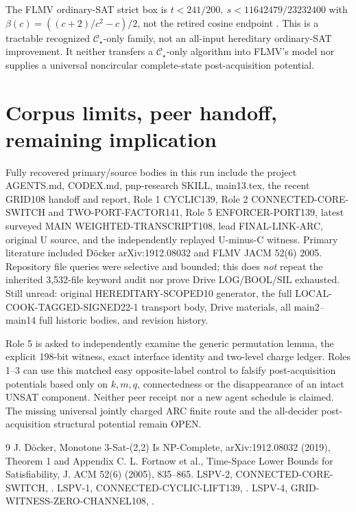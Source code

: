 \documentclass[11pt]{article}
\newcommand{\CS}{\mathcal C_\star}
\begin{document}
The FLMV ordinary-SAT strict box is \(t<241/200,\ s<11642479/23232400\) with \(\beta(c)=((c+2)/c^2-c)/2\), not the retired cosine endpoint \cite{flmv}. This is a tractable recognized \(\CS\)-only family, not an all-input hereditary ordinary-SAT improvement. It neither transfers a \(\CS\)-only algorithm into FLMV's model nor supplies a universal noncircular complete-state post-acquisition potential.

\section{Corpus limits, peer handoff, remaining implication}
Fully recovered primary/source bodies in this run include the project AGENTS.md, CODEX.md, pnp-research SKILL, main13.tex, the recent GRID108 handoff and report, Role 1 CYCLIC139, Role 2 CONNECTED-CORE-SWITCH and TWO-PORT-FACTOR141, Role 5 ENFORCER-PORT139, latest surveyed MAIN WEIGHTED-TRANSCRIPT108, lead FINAL-LINK-ARC, original U source, and the independently replayed U-minus-C witness. Primary literature included D\"ocker arXiv:1912.08032 and FLMV JACM 52(6) 2005. Repository file queries were selective and bounded; this does \emph{not} repeat the inherited 3,532-file keyword audit nor prove Drive LOG/BOOL/SIL exhausted. Still unread: original HEREDITARY-SCOPED10 generator, the full LOCAL-COOK-TAGGED-SIGNED22-1 transport body, Drive materials, all main2--main14 full historic bodies, and revision history.

Role 5 is asked to independently examine the generic permutation lemma, the explicit 198-bit witness, exact interface identity and two-level charge ledger. Roles 1--3 can use this matched easy opposite-label control to falsify post-acquisition potentials based only on \(k,m,q\), connectedness or the disappearance of an intact UNSAT component. Neither peer receipt nor a new agent schedule is claimed. The missing universal jointly charged ARC finite route and the all-decider post-acquisition structural potential remain OPEN.

\begin{thebibliography}{9}
 J. D\"ocker, Monotone 3-Sat-(2,2) Is NP-Complete, arXiv:1912.08032 (2019), Theorem 1 and Appendix C.
 L. Fortnow et al., Time-Space Lower Bounds for Satisfiability, J. ACM 52(6) (2005), 835--865.
 LSPV-2, CONNECTED-CORE-SWITCH, .
 LSPV-1, CONNECTED-CYCLIC-LIFT139, .
 LSPV-4, GRID-WITNESS-ZERO-CHANNEL108, .
\end{thebibliography}
\end{document}
